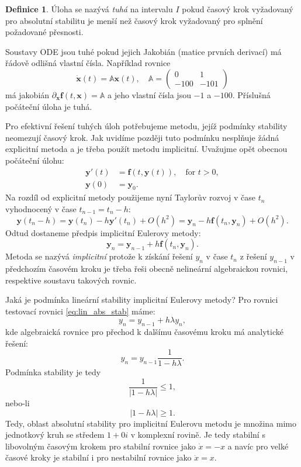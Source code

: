 \documentclass[a4paper, 12pt]{book}
\theoremstyle{definition}
\newtheorem{definition}[theorem]{Definice}
\def\vc#1{\mathbf{\boldsymbol{#1}}}     %
\def\tn#1{{\mathbb{#1}}}    %
\def\abs#1{\lvert#1\rvert}
\def\prtl{\partial}                                        %
\begin{document}
\begin{definition}
 Úloha se nazývá \emph{tuhá} na intervalu $I$ pokud časový krok vyžadovaný pro absolutní stabilitu je menší než časový krok vyžadovaný pro splnění požadované přesnosti.
\end{definition}
Soustavy ODE jsou tuhé pokud jejich Jakobián (matice prvních derivací) má řádově odlišná vlastní čísla. Například rovnice
\[
    \dot{\vc x}(t) = \tn A\vc x(t),\quad 
    \tn A= \begin{pmatrix}
                0 & 1\\
                -100 & -101
           \end{pmatrix}
\]
má jakobián $\prtl_{\vc x}  \vc f(t,\vc x) = \tn A$ a jeho vlastní čísla jsou $-1$ a $-100$. Příslušná počáteční úloha je tuhá. 

Pro efektivní řešení tuhých úloh potřebujeme metodu, jejíž podmínky stability neomezují časový krok. Jak uvidíme později tuto podmínku nesplňuje 
žádná explicitní metoda a je třeba použít metodu implicitní. Uvažujme opět obecnou počáteční úlohu:
\begin{align*}    
   \vc y'(t) &= \vc f(t,\vc y(t)), \quad \text{for }t>0,\\
   \vc y(0)&=\vc y_0.
\end{align*}
Na rozdíl od explicitní metody použijeme nyní Taylorův rozvoj v čase $t_{n}$ vyhodnocený v čase $t_{n-1}= t_n -h$:
\[
  \vc y(t_n - h) = \vc y(t_n) - h \vc y'(t_n) + O(h^2) =  \vc y_n - h \vc f(t_n, \vc y_n) + O(h^2).
\]
Odtud dostaneme předpis implicitní Eulerovy metody:
\[
    \vc y_n = \vc y_{n-1} + h\vc f(t_n, \vc y_n).
\]
Metoda se nazývá \emph{implicitní} protože k získání řešení $y_n$ v čase $t_n$ z řešení $y_{n-1}$ v předchozím časovém kroku je třeba řeši obecně 
nelineární algebraickou rovnici, respektive soustavu takových rovnic. 

Jaká je podmínka lineární stability implicitní Eulerovy metody? Pro rovnici testovací rovnici \eqref{eq:lin_abs_stab} máme:
\[
    y_n  = y_{n-1} + h\lambda y_n,
\]
kde algebraická rovnice pro přechod k dalšímu časovému kroku má analytické řešení:
\[
    y_n = y_{n-1}\frac{1}{1-h\lambda}.
\]
Podmínka stability je tedy 
\[
    \frac{1}{\abs{1-h\lambda}}\le 1,
\]
nebo-li
\[
    \abs{1-h\lambda}\ge 1.
\]
Tedy, oblast absolutní stability pro implicitní Eulerovu metodu je množina mimo jednotkový kruh se středem $1+0i$ v komplexní rovině.
Je tedy stabilní s libovolným časovým krokem pro stabilní rovnice jako $\dot{x} = -x$ a navíc pro velké časové kroky je stabilní i pro 
nestabilní rovnice jako $\dot{x} = x$.
\end{document}

